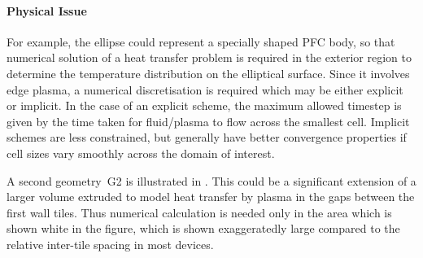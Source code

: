 \paragraph{Physical Issue}
For example, the ellipse
could represent a specially shaped PFC body, so that numerical solution of a heat
transfer problem is required in the exterior region to determine the temperature
distribution on the elliptical surface. Since it involves edge plasma, a numerical 
discretisation is required which may be either explicit or implicit. In the case
of an explicit scheme, the maximum allowed timestep is given by the time taken for
fluid/plasma to flow across the smallest cell. Implicit schemes are less constrained, but
generally have better convergence properties if cell sizes vary smoothly across
the domain of interest.

A second geometry~G2 is illustrated in . This could be a significant extension of 
a larger volume extruded to model heat transfer by plasma in the gaps between the first wall
tiles. Thus numerical calculation is needed only in the area which is shown white in the figure,
which is shown exaggeratedly large compared to the relative inter-tile spacing in most devices.

